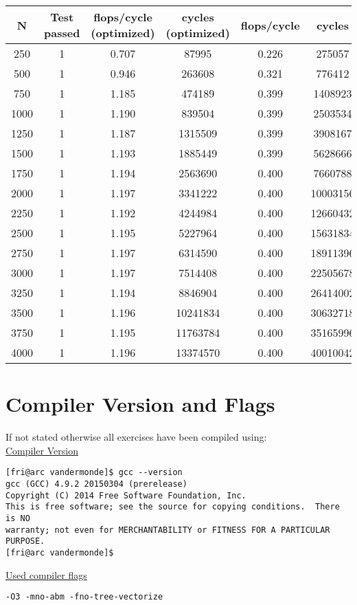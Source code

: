 \documentclass[10pt,a4paper,oneside,notitlepage]{report}
\begin{document}
\begin{tabular}{|c|c|c|c|c|c|}
\hline
\rowcolor{gray!30} 
\textbf{N} & \textbf{Test passed} & \textbf{flops/cycle (optimized)} & \textbf{cycles (optimized)} & \textbf{flops/cycle} & \textbf{cycles} \\ 
\hline 
250 & 1 & 0.707 & 87995 & 0.226 & 275057 \\ \hline
500 & 1 & 0.946 & 263608 & 0.321 & 776412 \\ \hline
750 & 1 & 1.185 & 474189 & 0.399 & 1408923 \\ \hline
1000 & 1 & 1.190 & 839504 & 0.399 & 2503534 \\ \hline
1250 & 1 & 1.187 & 1315509 & 0.399 & 3908167 \\ \hline
1500 & 1 & 1.193 & 1885449 & 0.399 & 5628666 \\ \hline
1750 & 1 & 1.194 & 2563690 & 0.400 & 7660788 \\ \hline
2000 & 1 & 1.197 & 3341222 & 0.400 & 10003156 \\ \hline
2250 & 1 & 1.192 & 4244984 & 0.400 & 12660432 \\ \hline
2500 & 1 & 1.195 & 5227964 & 0.400 & 15631834 \\ \hline
2750 & 1 & 1.197 & 6314590 & 0.400 & 18911396 \\ \hline
3000 & 1 & 1.197 & 7514408 & 0.400 & 22505678 \\ \hline
3250 & 1 & 1.194 & 8846904 & 0.400 & 26414002 \\ \hline
3500 & 1 & 1.196 & 10241834 & 0.400 & 30632718 \\ \hline
3750 & 1 & 1.195 & 11763784 & 0.400 & 35165996 \\ \hline
4000 & 1 & 1.196 & 13374570 & 0.400 & 40010042 \\ \hline
\end{tabular} 

\newpage

\section*{Compiler Version and Flags}
\label{compiler_version}
If not stated otherwise all exercises have been compiled using: \\ 

\underline{Compiler Version}
\begin{verbatim}
[fri@arc vandermonde]$ gcc --version
gcc (GCC) 4.9.2 20150304 (prerelease)
Copyright (C) 2014 Free Software Foundation, Inc.
This is free software; see the source for copying conditions.  There is NO
warranty; not even for MERCHANTABILITY or FITNESS FOR A PARTICULAR PURPOSE.
[fri@arc vandermonde]$
\end{verbatim}

\underline{Used compiler flags} 
\begin{verbatim}
-O3 -mno-abm -fno-tree-vectorize
\end{verbatim}
\end{document}
